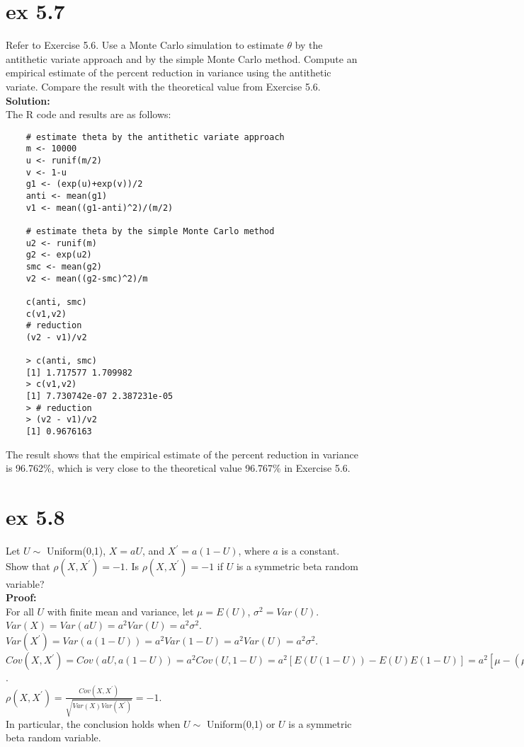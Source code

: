 \documentclass[UTF8]{ctexart}
\begin{document}
\section{ex 5.7}
Refer to Exercise 5.6. Use a Monte Carlo simulation to estimate $\theta$ by the
antithetic variate approach and by the simple Monte Carlo method. Compute
an empirical estimate of the percent reduction in variance using the antithetic
variate. Compare the result with the theoretical value from Exercise 5.6.\\
\textbf{Solution:}\\
The R code and results are as follows:
\begin{lstlisting}
    # estimate theta by the antithetic variate approach
    m <- 10000
    u <- runif(m/2)
    v <- 1-u
    g1 <- (exp(u)+exp(v))/2
    anti <- mean(g1)
    v1 <- mean((g1-anti)^2)/(m/2)
    
    # estimate theta by the simple Monte Carlo method
    u2 <- runif(m)
    g2 <- exp(u2)
    smc <- mean(g2)
    v2 <- mean((g2-smc)^2)/m
    
    c(anti, smc)
    c(v1,v2)
    # reduction
    (v2 - v1)/v2

    > c(anti, smc)
    [1] 1.717577 1.709982
    > c(v1,v2)
    [1] 7.730742e-07 2.387231e-05
    > # reduction
    > (v2 - v1)/v2
    [1] 0.9676163
\end{lstlisting}
The result shows that the empirical estimate of the percent reduction in variance is 96.762\%, which is very close to the theoretical value 96.767\% in Exercise 5.6.\\

\section{ex 5.8}
Let $U \sim$ Uniform(0,1), $X = aU$, and $X^{\prime} = a(1 − U)$, where $a$ is a constant.
Show that $\rho(X, X^{\prime}) = −1$. Is $\rho(X, X^{\prime}) = −1$ if $U$ is a symmetric beta random
variable?\\
\textbf{Proof:}\\
For all $U$ with finite mean and variance, let $\mu = E(U)$, $\sigma^2 = Var(U)$.\\
$Var(X) = Var(aU) = a^2Var(U) = a^2\sigma^2$.\\
$Var(X^{\prime}) = Var(a(1-U)) = a^2Var(1-U) = a^2Var(U) = a^2\sigma^2$.\\
$Cov(X, X^{\prime}) = Cov(aU, a(1-U)) = a^2Cov(U, 1-U) = a^2[E(U(1-U))-E(U)E(1-U)] = a^2[\mu-(\mu^2+\sigma^2)-\mu(1-\mu)]=-a^2\sigma^2$.\\
$\rho(X, X^{\prime}) = \frac{Cov(X, X^{\prime})}{\sqrt{Var(X)Var(X^{\prime})}} = -1$.\\
In particular, the conclusion holds when $U \sim$ Uniform(0,1) or $U$ is a symmetric beta random variable.\\
\end{document}
